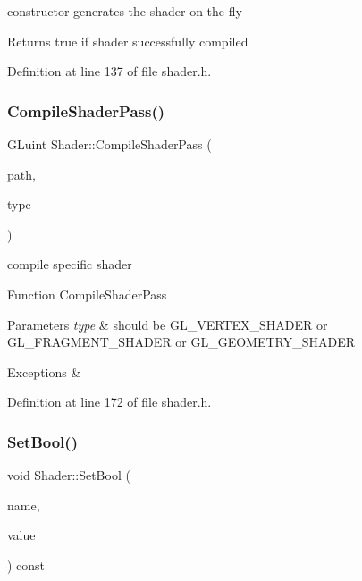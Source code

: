 constructor generates the shader on the fly \begin{DoxyReturn}{Returns}
true if shader successfully compiled 
\end{DoxyReturn}


Definition at line 137 of file shader.\+h.

\mbox{\label{class_shader_a3bca7990179d8def06caad688b58581c}} 
\subsubsection{\texorpdfstring{CompileShaderPass()}{CompileShaderPass()}}
{\footnotesize\ttfamily G\+Luint Shader\+::\+Compile\+Shader\+Pass (\begin{DoxyParamCaption}\item[{const char $\ast$}]{path,  }\item[{G\+Lenum}]{type }\end{DoxyParamCaption})\hspace{0.3cm}{\ttfamily [inline]}}



compile specific shader 

Function Compile\+Shader\+Pass 
\begin{DoxyParams}{Parameters}
{\em type} & should be {\ttfamily G\+L\+\_\+\+V\+E\+R\+T\+E\+X\+\_\+\+S\+H\+A\+D\+ER} or {\ttfamily G\+L\+\_\+\+F\+R\+A\+G\+M\+E\+N\+T\+\_\+\+S\+H\+A\+D\+ER} or {\ttfamily G\+L\+\_\+\+G\+E\+O\+M\+E\+T\+R\+Y\+\_\+\+S\+H\+A\+D\+ER} \\
\hline
\end{DoxyParams}

\begin{DoxyExceptions}{Exceptions}
{\em } & \\
\hline
\end{DoxyExceptions}


Definition at line 172 of file shader.\+h.

\mbox{\label{class_shader_a70cd07acf03715e4e927df1be5c5b5a0}} 
\subsubsection{\texorpdfstring{SetBool()}{SetBool()}}
{\footnotesize\ttfamily void Shader\+::\+Set\+Bool (\begin{DoxyParamCaption}\item[{const std\+::string \&}]{name,  }\item[{bool}]{value }\end{DoxyParamCaption}) const\hspace{0.3cm}{\ttfamily [inline]}}



